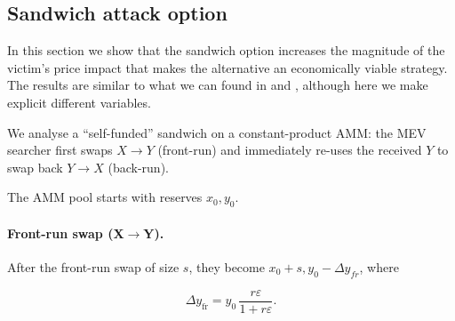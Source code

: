 \documentclass[a4paper,11pt]{article}
\begin{document}





\subsection{Sandwich attack option}
In this section we show that the sandwich option increases the magnitude of the victim's price impact that makes the alternative an economically viable strategy. The results are similar to what we can found in \cite{sea_of_coins} and \cite{heimbach}, although here we make explicit different variables.

We analyse a “self-funded” sandwich on a constant-product AMM: the MEV
searcher first swaps \(X\!\to\!Y\) (front-run) and immediately re-uses
the received \(Y\) to swap back \(Y\!\to\!X\) (back-run). 

The AMM pool starts with reserves $x_0,y_0$. 
\paragraph{Front-run swap (X$\to$Y).}After the front-run swap of size $s$, they become $x_0 + s,y_0-\Delta y_{fr}$, where

\begin{equation}
\Delta y_{\mathrm{fr}}
  =y_0\,\frac{r\varepsilon}{1+r\varepsilon}.
\end{equation}
\end{document}
